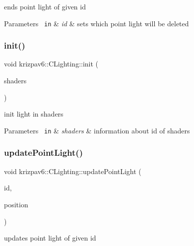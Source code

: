 ends point light of given id 


\begin{DoxyParams}[1]{Parameters}
\mbox{\texttt{ in}}  & {\em id} & sets which point light will be deleted \\
\hline
\end{DoxyParams}
\mbox{\label{classkrizpav6_1_1_c_lighting_af451ddd4f4cf7460785a5a7ff32e34a6}} 
\subsubsection{\texorpdfstring{init()}{init()}}
{\footnotesize\ttfamily void krizpav6\+::\+C\+Lighting\+::init (\begin{DoxyParamCaption}\item[{G\+Luint}]{shaders }\end{DoxyParamCaption})}



init light in shaders 


\begin{DoxyParams}[1]{Parameters}
\mbox{\texttt{ in}}  & {\em shaders} & information about id of shaders \\
\hline
\end{DoxyParams}
\mbox{\label{classkrizpav6_1_1_c_lighting_a933ede72c1f0a6bd7ca8667100678dd2}} 
\subsubsection{\texorpdfstring{updatePointLight()}{updatePointLight()}\hspace{0.1cm}{\footnotesize\ttfamily [1/2]}}
{\footnotesize\ttfamily void krizpav6\+::\+C\+Lighting\+::update\+Point\+Light (\begin{DoxyParamCaption}\item[{int}]{id,  }\item[{glm\+::vec3}]{position }\end{DoxyParamCaption})}



updates point light of given id 


